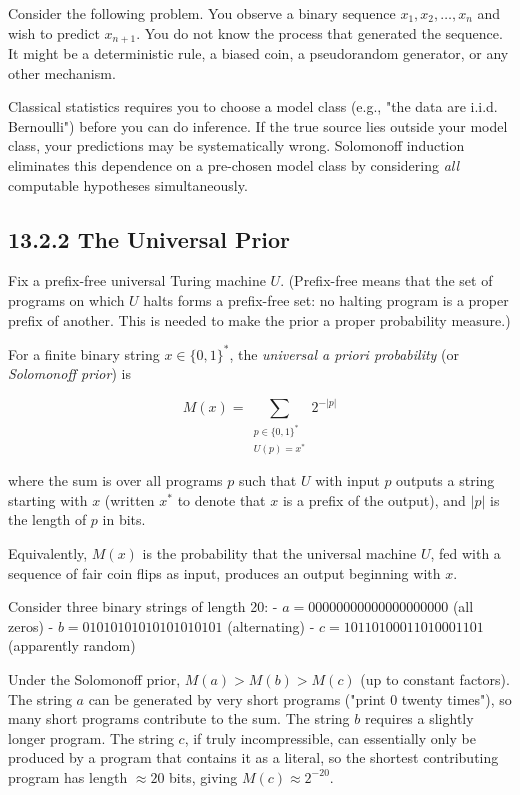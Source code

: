 Consider the following problem. You observe a binary sequence $x_1, x_2, \ldots, x_n$ and wish to predict $x_{n+1}$. You do not know the process that generated the sequence. It might be a deterministic rule, a biased coin, a pseudorandom generator, or any other mechanism.

Classical statistics requires you to choose a model class (e.g., "the data are i.i.d. Bernoulli") before you can do inference. If the true source lies outside your model class, your predictions may be systematically wrong. Solomonoff induction eliminates this dependence on a pre-chosen model class by considering \textit{all} computable hypotheses simultaneously.

\subsection{13.2.2 The Universal Prior}

Fix a prefix-free universal Turing machine $U$. (Prefix-free means that the set of programs on which $U$ halts forms a prefix-free set: no halting program is a proper prefix of another. This is needed to make the prior a proper probability measure.)

\begin{definition}
For a finite binary string $x \in \{ 0,1\}^*$, the \textit{universal a priori probability} (or \textit{Solomonoff prior}) is

\[M(x) = \sum_{\substack{p \in \{ 0,1\}^* \\ U(p) = x^*}} 2^{-|p|}\]

where the sum is over all programs $p$ such that $U$ with input $p$ outputs a string starting with $x$ (written $x^*$ to denote that $x$ is a prefix of the output), and $|p|$ is the length of $p$ in bits.

Equivalently, $M(x)$ is the probability that the universal machine $U$, fed with a sequence of fair coin flips as input, produces an output beginning with $x$.
\end{definition}

\begin{example}
Consider three binary strings of length 20:
- $a = 00000000000000000000$ (all zeros)
- $b = 01010101010101010101$ (alternating)
- $c = 10110100011010001101$ (apparently random)

Under the Solomonoff prior, $M(a) > M(b) > M(c)$ (up to constant factors). The string $a$ can be generated by very short programs ("print 0 twenty times"), so many short programs contribute to the sum. The string $b$ requires a slightly longer program. The string $c$, if truly incompressible, can essentially only be produced by a program that contains it as a literal, so the shortest contributing program has length $\approx 20$ bits, giving $M(c) \approx 2^{-20}$.
\end{example}

